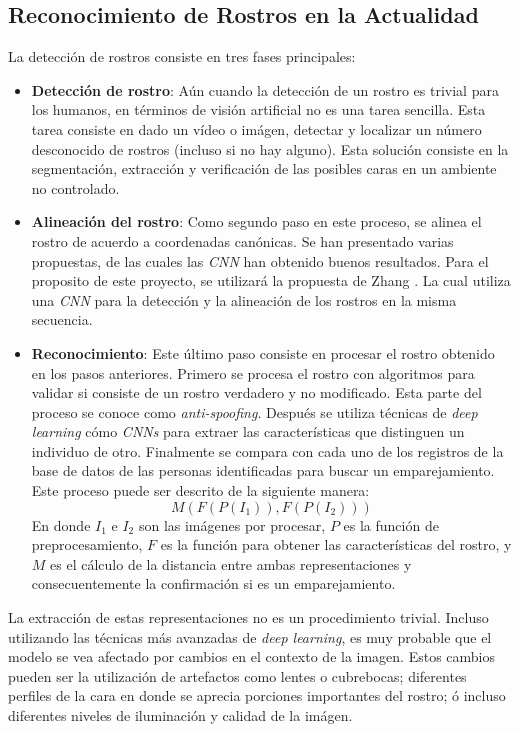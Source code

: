 \documentclass[letterpaper, 10 pt, conference]{ieeeconf}  %
\begin{document}
    \subsection{Reconocimiento de Rostros en la Actualidad}
    La detección de rostros consiste en tres fases principales:
    \begin{itemize}
        \item \textbf{Detección de rostro}: Aún cuando la detección de un rostro es trivial
            para los humanos, en términos de visión artificial no es una tarea sencilla. Esta
            tarea consiste en dado un vídeo o imágen, detectar y localizar un número
            desconocido de rostros (incluso si no hay alguno). Esta solución consiste en la
            segmentación, extracción y verificación de las posibles caras en un ambiente
            no controlado. \cite{FaceDetection2001}

        \item \textbf{Alineación del rostro}: Como segundo paso en este proceso, se alinea
            el rostro de acuerdo a coordenadas canónicas. \cite{Wang2021} Se han presentado
            varias propuestas, de las cuales las \textit{CNN} han obtenido buenos resultados.
            Para el proposito de este proyecto, se utilizará la propuesta de Zhang \cite{MTCNN}.
            La cual utiliza una \textit{CNN} para la detección y la alineación de los rostros
            en la misma secuencia.

        \item \textbf{Reconocimiento}: Este último paso consiste en procesar el rostro obtenido
            en los pasos anteriores. Primero se procesa el rostro con algoritmos para validar
            si consiste de un rostro verdadero y no modificado. Esta parte del proceso se conoce
            como \textit{anti-spoofing}. Después se utiliza técnicas de \textit{deep learning} cómo
            \textit{CNNs} para extraer las características que distinguen un individuo de otro.
            Finalmente se compara con cada uno de los registros de la base de datos de las
            personas identificadas para buscar un emparejamiento.
            Este proceso puede ser descrito de la siguiente manera: \cite{Wang2021}
                \[ M(F(P(I_1)), F(P(I_2))) \]
            En donde \textit{$I_1$} e \textit{$I_2$} son las imágenes por procesar, \textit{$P$}
            es la función de preprocesamiento, \textit{$F$} es la función para obtener las
            características del rostro, y \textit{$M$} es el cálculo de la distancia entre
            ambas representaciones y consecuentemente la confirmación si es un emparejamiento.
    \end{itemize}
    La extracción de estas representaciones no es un procedimiento trivial. Incluso utilizando
    las técnicas más avanzadas de \textit{deep learning}, es muy probable que el modelo se vea
    afectado por cambios en el contexto de la imagen. Estos cambios pueden ser la utilización
    de artefactos como lentes o cubrebocas; diferentes perfiles de la cara en donde se aprecia
    porciones importantes del rostro; ó incluso diferentes niveles de iluminación y calidad de la
    imágen. \cite{Bodini2019}
\end{document}
